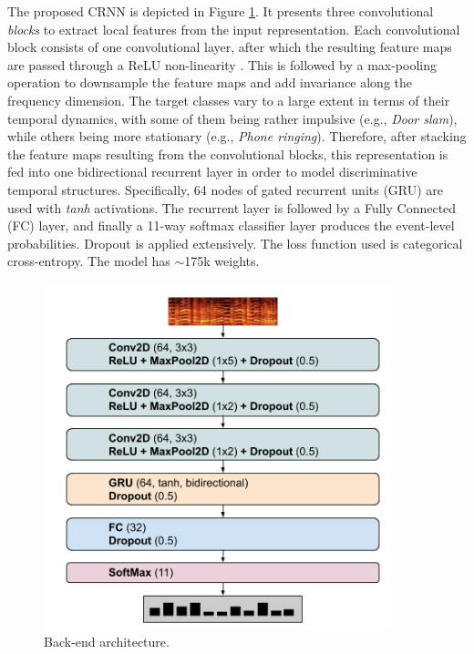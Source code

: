 The proposed CRNN is depicted in Figure \ref{fig:archi}.
It presents three convolutional \textit{blocks} to extract local features from the input representation.
Each convolutional block consists of one convolutional layer, after which the resulting feature maps are passed through a ReLU non-linearity \cite{nair2010rectified}.
This is followed by a max-pooling operation to downsample the feature maps and add invariance along the frequency dimension.
The target classes vary to a large extent in terms of their temporal dynamics, with some of them being rather impulsive (e.g., \textit{Door slam}), while others being more stationary (e.g., \textit{Phone ringing}). 
Therefore, after stacking the feature maps resulting from the convolutional blocks, this representation is fed into one bidirectional recurrent layer in order to model discriminative temporal structures.
Specifically, 64 nodes of gated recurrent units (GRU) are used with \textit{tanh} activations.
The recurrent layer is followed by a Fully Connected (FC) layer, and finally a 11-way softmax classifier layer produces the event-level probabilities.
Dropout is applied extensively.
The loss function used is categorical cross-entropy.
The model has $\sim$175k weights.

\begin{figure}[ht]
  \vspace{-3mm}
  \centering
  \centerline{\includegraphics[width=0.9\textwidth]{Figures/SELD/DCASE19Task3_backend_archi_v3.png}}
  \vspace{-2mm}
  \caption{Back-end architecture.}
  \label{fig:archi}
    \vspace{-5mm}
\end{figure}




